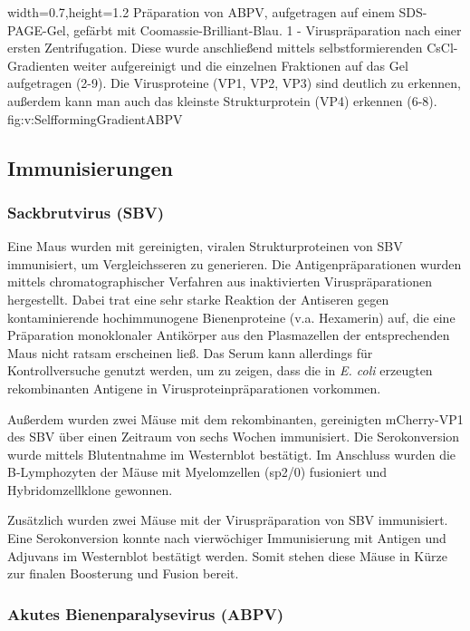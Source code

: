 {width=0.7\textwidth,height=1.2\textheight}
{Präparation von ABPV, aufgetragen auf einem SDS-PAGE-Gel, gefärbt mit Coomassie-Brilliant-Blau. 
1 - Viruspräparation nach einer ersten Zentrifugation. Diese wurde anschließend mittels selbstformierenden CsCl-Gradienten weiter aufgereinigt und die einzelnen Fraktionen auf das Gel aufgetragen (2-9). Die Virusproteine (VP1, VP2, VP3) sind deutlich zu erkennen, außerdem kann man auch das kleinste Strukturprotein (VP4) erkennen (6-8). }%
{}%
{fig:v:SelfformingGradientABPV}%

\subsection{Immunisierungen}
\subsubsection{Sackbrutvirus (SBV)}

Eine Maus wurden mit gereinigten, viralen Strukturproteinen von SBV immunisiert, um Vergleichsseren zu generieren. Die Antigenpräparationen wurden mittels chromatographischer Verfahren aus inaktivierten Viruspräparationen hergestellt. Dabei trat eine sehr starke Reaktion der Antiseren gegen kontaminierende hochimmunogene Bienenproteine (v.a. Hexamerin) auf, die eine Präparation monoklonaler Antikörper aus den Plasmazellen der entsprechenden Maus nicht ratsam erscheinen ließ. Das Serum kann allerdings für Kontrollversuche genutzt werden, um zu zeigen, dass die in \textit{E. coli} erzeugten rekombinanten Antigene in Virusproteinpräparationen vorkommen.

Außerdem wurden zwei Mäuse mit dem rekombinanten, gereinigten mCherry-VP1 des SBV über einen Zeitraum von sechs Wochen immunisiert. Die Serokonversion wurde mittels Blutentnahme im Westernblot bestätigt. Im Anschluss wurden die B-Lymphozyten der Mäuse mit Myelomzellen (sp2/0) fusioniert und Hybridomzellklone gewonnen.

Zusätzlich wurden zwei Mäuse mit der Viruspräparation von SBV immunisiert. Eine Serokonversion konnte nach vierwöchiger Immunisierung mit Antigen und Adjuvans im Westernblot bestätigt werden. Somit stehen diese Mäuse in Kürze zur finalen Boosterung und Fusion bereit.

\subsubsection{Akutes Bienenparalysevirus (ABPV)}

